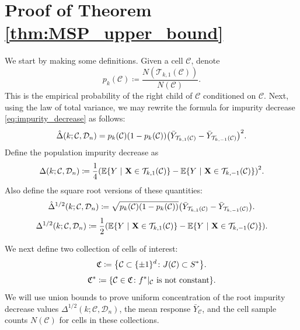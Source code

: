 \documentclass[11pt]{article}
\newcommand{\bX}{\mathbf{X}}
\DeclarePairedDelimiter{\braces}{\lbrace}{\rbrace}
\DeclarePairedDelimiter{\paren}{(}{)}
\newcommand{\E}{\mathbb{E}}
\newcommand{\cell}{\mathcal{C}}
\newcommand{\binspace}{\braces{\pm 1}^\nfeats}
\newcommand{\nfeats}{d}
\newcommand{\data}[1][n]{\mathcal{D}_{#1}}
\newcommand{\cellfeatindices}{J}
\newcommand{\suppset}{S^*}
\newcommand{\splitoperator}{\mathcal{T}}
\newcommand{\rid}{\Delta^{1/2}}
\newcommand{\ridhat}{\hat\Delta^{1/2}}
\newcommand{\cellcollection}{{\mathfrak{C}^*}}
\newcommand{\secondcellcollection}{\mathfrak{C}}
\begin{document}
\section{Proof of Theorem \ref{thm:MSP_upper_bound}}
\label{sec:upper_bounds_proofs}

We start by making some definitions.
Given a cell $\cell$, denote
\begin{equation}
    p_k(\cell) \coloneqq \frac{N(\splitoperator_{k,1}(\cell))}{N(\cell)}.
\end{equation}
This is the empirical probability of the right child of $\cell$ conditioned on $\cell$.
Next, using the law of total variance, we may rewrite the formula for impurity decrease \eqref{eq:impurity_decrease} as follows:
\begin{equation} \label{eq:imp_dec_appendix}
    \hat\Delta(k; \cell, \data) = p_k(\cell)(1-p_k(\cell))\paren*{\bar Y_{\splitoperator_{k,1}(\cell)} - \bar Y_{\splitoperator_{k,-1}(\cell)}}^2.
\end{equation}
Define the population impurity decrease as
\begin{equation} \label{eq:pop_imp_dec_appendix}
    \Delta(k; \cell, \data) \coloneqq \frac{1}{4}\paren*{\E\braces*{Y~|~\bX \in \splitoperator_{k,1}(\cell)} - \E\braces*{Y~|~\bX \in \splitoperator_{k,-1}(\cell)}}^2.
\end{equation}
Also define the square root versions of these quantities:
\begin{equation} \label{eq:rid}
    \ridhat(k; \cell, \data) \coloneqq \sqrt{p_k(\cell)(1-p_k(\cell))}\paren*{\bar Y_{\splitoperator_{k,1}(\cell)} - \bar Y_{\splitoperator_{k,-1}(\cell)}}.
\end{equation}
\begin{equation}
    \rid(k; \cell, \data) \coloneqq \frac{1}{2}\paren*{\E\braces*{Y~|~\bX \in \splitoperator_{k,1}(\cell)} - \E\braces*{Y~|~\bX \in \splitoperator_{k,-1}(\cell)}}.
\end{equation}

We next define two collection of cells of interest:
\begin{equation}
    \secondcellcollection \coloneqq \braces*{\cell \subset \binspace \colon \cellfeatindices(\cell) \subset \suppset}.
\end{equation}
\begin{equation}
    \cellcollection \coloneqq \braces*{\cell \in \secondcellcollection \colon f^*|_{\cell}~\text{is not constant}}.
\end{equation}
We will use union bounds to prove uniform concentration of the root impurity decrease values $\rid(k; \cell, \data)$, the mean response $\bar Y_{\cell}$, and the cell sample counts $N(\cell)$ for cells in these collections.
\end{document}
